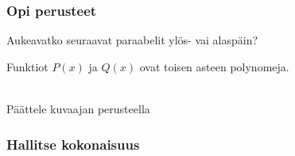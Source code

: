 \begin{tehtavasivu}

\subsubsection*{Opi perusteet}

\begin{tehtava}
  Aukeavatko seuraavat paraabelit ylös- vai alaspäin?
  \begin{alakohdat}
  \end{alakohdat}

  \begin{vastaus}
    \begin{alakohdat}
    \end{alakohdat}
  \end{vastaus}
\end{tehtava}

\begin{tehtava}
Funktiot $P(x)$ ja $Q(x)$ ovat toisen asteen polynomeja.\\
\begin{kuvaajapohja}{1}{-2}{3}{-1}{3}
\end{kuvaajapohja} \\
Päättele kuvaajan perusteella
\begin{alakohdat}
\end{alakohdat}

\begin{vastaus}
\begin{alakohdat}
\end{alakohdat}
\end{vastaus}
\end{tehtava}

\subsubsection*{Hallitse kokonaisuus}


\end{tehtavasivu}

